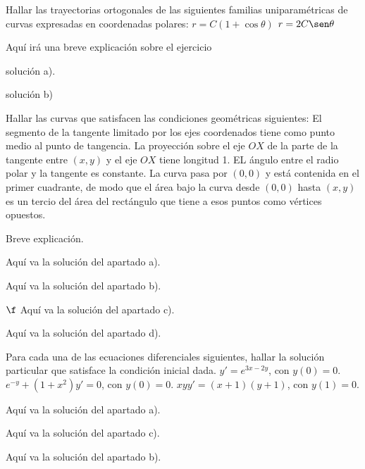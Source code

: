 \documentclass[nochap]{apuntes}
\begin{document}
\begin{problem}[11]
Hallar las trayectorias ortogonales de las siguientes familias uniparamétricas de curvas expresadas en coordenadas polares:
\ppart
$r=C(1+\cos \theta)$
\ppart
$r=2C\sen \theta$

\solution

\begin{expla}
Aquí irá una breve explicación sobre el ejercicio
\end{expla}

\spart
solución a).

\spart
solución b)

\end{problem}
\newpage

\begin{problem}[12]
Hallar las curvas que satisfacen las condiciones geométricas siguientes:
\ppart
El segmento de la tangente limitado por los ejes coordenados tiene como punto medio al punto de tangencia.
\ppart
La proyección sobre el eje $OX$ de la parte de la tangente entre $(x,y)$ y el eje $OX$ tiene longitud 1.
\ppart
EL ángulo entre el radio polar y la tangente es constante.
\ppart
La curva pasa por $(0,0)$ y está contenida en el primer cuadrante, de modo que el área bajo la curva desde $(0,0)$ hasta $(x,y)$ es un tercio del área del rectángulo que tiene a esos puntos como vértices opuestos.
\solution

\begin{expla}
Breve explicación.
\end{expla}

\spart
Aquí va la solución del apartado a).

\spart 
Aquí va la solución del apartado b).

\spart
$\f$ Aquí va la solución del apartado c).

\spart 
Aquí va la solución del apartado d).

\end{problem}
\newpage
\begin{problem}[13]
Para cada una de las ecuaciones diferenciales siguientes, hallar la solución particular que satisface la condición inicial dada.
\ppart $y'=e^{3x-2y}$, con $y(0)=0$.
\ppart $e^{-y}+(1+x^2)y'=0$, con $y(0)=0$.
\ppart $xyy'=(x+1)(y+1)$, con $y(1)=0$.

\solution

\begin{expla}
\end{expla}
\spart
Aquí va la solución del apartado a).

\spart
Aquí va la solución del apartado c).

\spart
Aquí va la solución del apartado b).

\end{problem}
\end{document}
